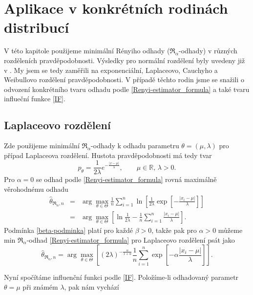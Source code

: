 
\chapter{Aplikace v konkrétních rodinách distribucí}

V této kapitole použijeme minimální Rényiho odhady ($\mathfrak{R}_\alpha$-odhady) v různých rozděleních pravděpodobnosti. Výsledky pro normální rozdělení byly uvedeny již v \cite{Demut2010}. My jsem se tedy zaměřili na exponenciální, Laplaceovo, Cauchyho a Weibullovo rozdělení pravděpodobnosti. V případě těchto rodin jsme se snažili o odvození konkrétního tvaru odhadu podle \eqref{Renyi-estimator_formula} a také tvaru influeční funkce \eqref{IF}.

\section{Laplaceovo rozdělení} %

Zde použijeme minimální $\mathfrak{R}_\alpha$-odhady k odhadu parametru $\theta = (\mu,\lambda)$ pro případ Laplaceova rozdělení. Hustota pravděpodobnosti má tedy tvar
\begin{equation}
	p_\theta = \frac{1}{2\lambda} e^{-\frac{|x-\mu|}{\lambda}}, \qquad \mu\in \mathbb{R},\, \lambda>0.
\end{equation}
Pro $\alpha = 0$ se odhad podle \eqref{Renyi-estimator_formula} rovná maximálně věrohodnému odhadu
\begin{eqnarray}
	\hat{\theta}_{\mathfrak{R}_\alpha,n} & = & \arg \max_{\theta \in \Theta} \frac{1}{n} \sum^n_{i=1} \ln \left[ \frac{1}{2\lambda}\exp \left[-\frac{|x_i-\mu|}{\lambda} \right] \right] \nonumber \\
	& = & \arg \max_{\theta \in \Theta} \left[ \ln \frac{1}{2\lambda} - \frac{1}{n} \sum^n_{i=1} \frac{|x_i-\mu|}{\lambda} \right].
\end{eqnarray}
Podmínka \ref{beta-podminka} platí pro každé $\beta>0$, takže pak pro $\alpha>0$ můžeme  min $\mathfrak{R}_\alpha$-odhad \eqref{Renyi-estimator_formula} pro Laplaceovo rozdělení psát jako 
\begin{equation}
	\hat{\theta}_{\mathfrak{R}_\alpha,n} = \arg \max_{\theta \in \Theta} \left[ (2\lambda)^{-\frac{\alpha}{1+\alpha}} \frac{1}{n} \sum_{i=1}^n \exp \left[-\alpha\frac{|x_i-\mu|}{\lambda} \right] \right].
	\label{renyi-formula-laplace}
\end{equation}

Nyní spočítáme influenční funkci podle \eqref{IF}. Položíme-li odhadovaný parametr $\theta = \mu$ při známém $\lambda$, pak nám vychází 

